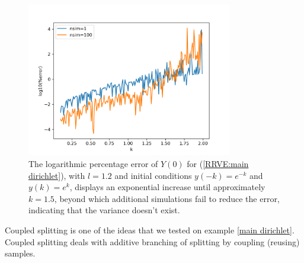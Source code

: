 \documentclass[a4paper,12pt]{article}
\begin{document}
\begin{figure}[h!]
    \centering
    \includegraphics[width=0.8\textwidth]{plots/mainD explosion.png}
    \caption{The logarithmic percentage error of $Y(0)$ for
    (\ref{RRVE:main dirichlet}), with $l=1.2$ and initial conditions
    $y(-k)=e^{-k}$ and $y(k)=e^{k}$, displays an exponential
    increase until approximately $k=1.5$, beyond which additional
    simulations fail to reduce the error, indicating that the variance
    doesn't exist.}
    \label{fig:mainD explosion}
\end{figure}

Coupled splitting is one of the ideas that we tested on example \ref{main dirichlet}.
Coupled splitting deals with additive branching of splitting by coupling (reusing)
samples.
\end{document}
